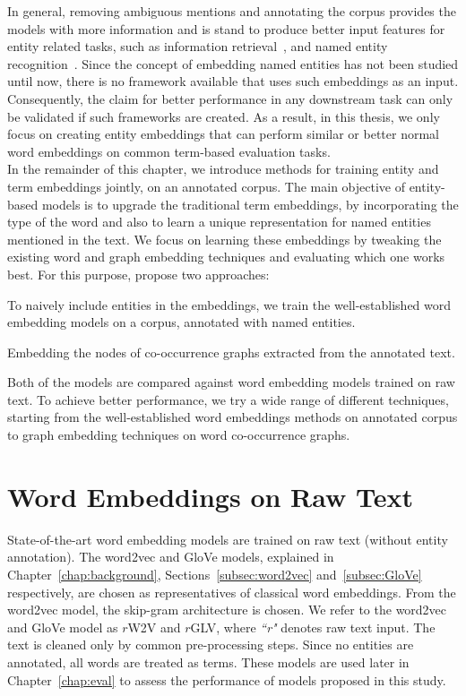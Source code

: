 In general, removing ambiguous mentions and annotating the corpus provides the models with more information and is stand to produce better input features for entity related tasks, such as information retrieval~, and named entity recognition~.
Since the concept of embedding named entities has not been studied until now, there is no framework available that uses such embeddings as an input. Consequently, the claim for better performance in any downstream task can only be validated if such frameworks are created. As a result, in this thesis, we only focus on creating entity embeddings that can perform similar or  better  normal word embeddings on  common term-based evaluation tasks.\\
In the remainder of this chapter, we introduce methods for training entity and term embeddings jointly, on an annotated corpus. The main objective of entity-based models is to upgrade the traditional term embeddings, by incorporating the type of the word and also to learn a unique representation for named entities mentioned in the text. We focus on learning these embeddings by tweaking the existing word and graph embedding techniques and evaluating which one works best. For this purpose,  propose two approaches: 
\begin{compactenum}
\item To naively include entities in the embeddings, we train the well-established word embedding models on a corpus, annotated with named entities. 
\item Embedding the nodes of co-occurrence graphs extracted from the annotated text. 
\end{compactenum}
Both of the models are compared against word embedding models trained on raw text. To achieve better performance, we try a wide range of different techniques, starting from the well-established word embeddings methods on  annotated corpus to graph embedding techniques on word co-occurrence graphs. 

\section{Word Embeddings on Raw Text}\label{sec:raw}
State-of-the-art word embedding models are trained on raw text (without entity annotation). The word2vec and GloVe models, explained in Chapter~\ref{chap:background}, Sections~\ref{subsec:word2vec} and~\ref{subsec:GloVe} respectively, are chosen as representatives of classical word embeddings. From the word2vec model, the skip-gram architecture is chosen. We refer to the word2vec and GloVe model as $r$W2V and  $r$GLV, where \emph{``r"} denotes raw text input. The text is cleaned only by common pre-processing steps.
Since no entities are annotated, all words are treated as terms. These models are used later in Chapter~\ref{chap:eval} to assess the performance of models proposed in this study. 


